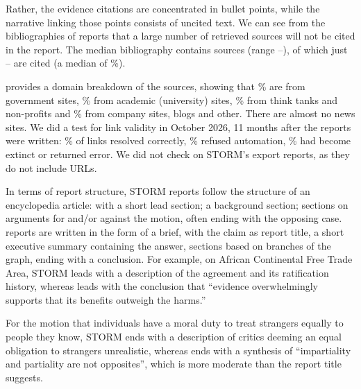 Rather, the evidence citations are concentrated in bullet points, while the narrative linking those points consists of uncited text. We can see from the bibliographies of \sys{} reports that a large number of retrieved sources will not be cited in the report. The median \sys{} bibliography contains \bibMedDc{} sources (range \bibMinDc--\bibMaxDc), of which just \atUsedMin--\atUsedMax{} are cited (a median of \atUsedShare\%).

\begin{table}[t]
\centering
\small

\caption{The domains of the \srcN{} sources in ten \sys{} bibliographies, classified by host name.}
\label{tab:sources}
\end{table}

 provides a domain breakdown of the \srcN{} sources, showing that \srcShareGovernment\% are from government sites, \srcShareAcademic\% from academic (university) sites, \srcShareThinkTankOr\% from think tanks and non-profits and \srcShareCompanyBlogOrOther\% from company sites, blogs and other. There are almost no news sites. We did a test for link validity in October 2026, 11 months after the reports were written: \linkOkPct\% of links resolved correctly, \linkBlockedPct\% refused automation, \linkDeadPct\% had become extinct or returned error. We did not check on STORM's export reports, as they do not include URLs.

In terms of report structure, STORM reports follow the structure of an encyclopedia article: with a short lead section; a background section; sections on arguments for and/or against the motion, often ending with the opposing case. \sys{} reports are written in the form of a brief, with the claim as report title, a short executive summary containing the answer, sections based on branches of the graph, ending with a conclusion. For example, on African Continental Free Trade Area, STORM leads with a description of the agreement and its ratification history, whereas \sys{} leads with the conclusion that ``evidence overwhelmingly supports that its benefits outweigh the harms.''

For the motion that individuals have a moral duty to treat strangers equally to people they know, STORM ends with a description of critics deeming an equal obligation to strangers unrealistic, whereas \sys{} ends with a synthesis of ``impartiality and partiality are not opposites'', which is more moderate than the report title suggests.

\begin{table}[t]
\centering
\small

\caption{Position of the reported \sys{} reports. We specify the position as it is relative to the wording of the motion: \emph{firm} reports repeat the claims in the motion's title; \emph{qualified} reports restrict these claims; \emph{conditional} reports make them dependent on specific conditions or values that are not part of the motion, and \emph{compromise} reports take a position on neither side.}
\label{tab:stance}
\end{table}
